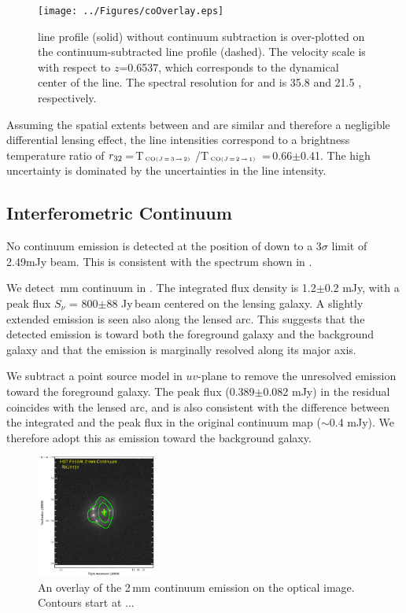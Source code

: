 \documentclass[]{emulateapj}
\begin{document}
\begin{figure}[!Htbp]
\centering
\texttt{[image: ../Figures/coOverlay.eps]}
\caption{
\carma \cco line profile (solid) without continuum subtraction is
over-plotted on the continuum-subtracted \bco line profile (dashed).
The velocity scale is with respect to $z$=0.6537, which corresponds to the
dynamical center of the \bco line. The spectral resolution for \cco and \bco
is 35.8 \kms and 21.5 \kms, respectively.
 \label{fig:co32spec}}
\end{figure}

Assuming the spatial extents between \bco and \cco are similar and therefore
a negligible differential lensing effect, the line intensities
correspond to a brightness temperature ratio of
$r_{\rm 32}$\,=\,T$_{\tiny \mbox{CO($J$\,=\,3\,$\rightarrow$\,2) }}$/T$_{\tiny \mbox{CO($J$\,=\,2\,$\rightarrow$\,1) }}$\,=\,0.66$\pm$0.41.
The high uncertainty is dominated by the uncertainties in the \cco line
intensity.

\subsection{Interferometric Continuum}

No continuum emission is detected at the position of \cco
down to a 3$\sigma$ limit of 2.49mJy beam\pmOne.
This is consistent with the spectrum shown in .

We detect \,mm continuum in \Fig{2mm}. The integrated flux density is
1.2$\pm$0.2 mJy, with a peak flux $S_\nu$ = 800$\pm$88 \micron Jy\,beam\pmOne
centered on the lensing galaxy. A slightly extended emission is seen
also along the lensed arc. This suggests that the detected emission is
toward both the foreground galaxy and the background galaxy and that the
emission is marginally resolved along its major axis.

We subtract a point source model in $uv$-plane to remove the unresolved
emission toward the foreground galaxy. The peak flux (0.389$\pm$0.082 mJy)
in the residual coincides with the lensed arc, and is also consistent with
the difference between the integrated and the peak flux
in the original continuum map ($\sim$0.4 mJy). We therefore adopt this as
emission toward the background galaxy.


\begin{figure}[!htbp]
\centering
\includegraphics[width=0.35\textwidth]{../Figures/F555W_ContPdBI.eps}
\caption{
An overlay of the 2\,mm continuum emission on the optical image. Contours start at ...
\label{fig:2mm}}
\end{figure}
\end{document}

